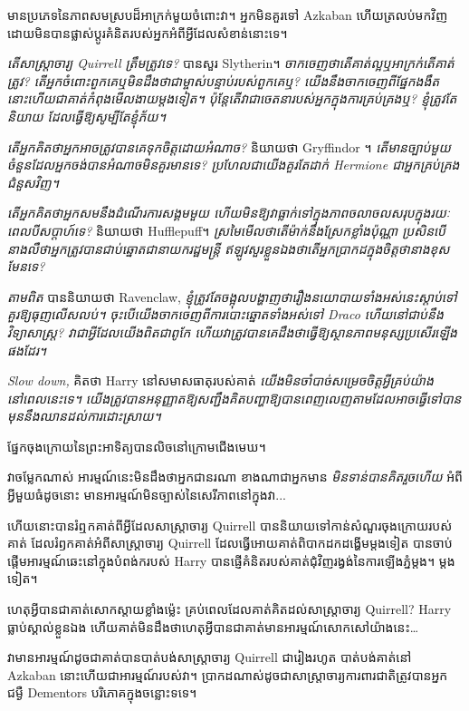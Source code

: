 {{{{{{{មានប្រភេទនៃភាពសមស្របដ៏អាក្រក់មួយចំពោះវា។ អ្នកមិនគួរទៅ Azkaban ហើយត្រលប់មកវិញដោយមិនបានផ្លាស់ប្តូរគំនិតរបស់អ្នកអំពីអ្វីដែលសំខាន់នោះទេ។

\emph{តើសាស្រ្តាចារ្យ Quirrell ត្រឹមត្រូវទេ?} បានសួរ Slytherin។ \emph{ចាកចេញថាតើគាត់ល្អឬអាក្រក់តើគាត់\emph{ត្រូវ}? តើ​អ្នក​ចំពោះ​ពួកគេ​ឬ​មិន​ដឹង​ថា​ជា​ម្ចាស់​បន្ទាប់​របស់​ពួកគេ​ឬ? យើងនឹងចាកចេញពីផ្នែកងងឹត នោះហើយជាគាត់កំពុងមើលងាយម្តងទៀត។ ប៉ុន្តែ​តើ​វា​ជា​ចេតនា​របស់​អ្នក​ក្នុង​ការ​គ្រប់​គ្រង​ឬ? ខ្ញុំត្រូវតែនិយាយ ដែលធ្វើឱ្យសូម្បីតែ\emph{ខ្ញុំ}ភ័យ។}

\emph{តើ​អ្នក​គិត​ថា​អ្នក​អាច​ត្រូវ​បាន​គេ​ទុក​ចិត្ត​ដោយ​អំណាច?} និយាយ​ថា Gryffindor ។ \emph{តើ​មាន​ច្បាប់​មួយ​ចំនួន​ដែល​អ្នក​ចង់​បាន​អំណាច​មិន​គួរ​មាន​ទេ? ប្រហែលជាយើងគួរតែដាក់ Hermione ជាអ្នកគ្រប់គ្រងជំនួសវិញ។}

\emph{តើ​អ្នក​គិត​ថា​អ្នក​សម​នឹង​ដំណើរការ​សង្គម​មួយ ហើយ​មិន​ឱ្យ​វា​ធ្លាក់​ទៅ​ក្នុង​ភាព​ចលាចល​សរុប​ក្នុង​រយៈ​ពេល​បី​សប្តាហ៍​ទេ?} និយាយ​ថា Hufflepuff។ \emph{ស្រមៃមើលថាតើម៉ាក់នឹងស្រែកខ្លាំងប៉ុណ្ណា ប្រសិនបើនាងលឺថាអ្នកត្រូវបានជាប់ឆ្នោតជានាយករដ្ឋមន្ត្រី ឥឡូវសួរខ្លួនឯងថាតើអ្នកប្រាកដក្នុងចិត្តថានាងខុសមែនទេ?}

\emph{តាមពិត} បាននិយាយថា Ravenclaw, \emph{ខ្ញុំត្រូវតែចង្អុលបង្ហាញថារឿងនយោបាយទាំងអស់នេះស្តាប់ទៅគួរឱ្យធុញលើសលប់។ ចុះបើយើងចាកចេញពីការបោះឆ្នោតទាំងអស់ទៅ Draco ហើយនៅជាប់នឹងវិទ្យាសាស្ត្រ? វា​ជា​អ្វី​ដែល​យើង​ពិត​ជា​ពូកែ ហើយ​វា​ត្រូវ​បាន​គេ​ដឹង​ថា​ធ្វើ​ឱ្យ​ស្ថានភាព​មនុស្ស​ប្រសើរ​ឡើង​ផង​ដែរ។}

\emph{Slow down,} គិតថា Harry នៅសមាសធាតុរបស់គាត់ \emph{យើងមិនចាំបាច់សម្រេចចិត្តអ្វីគ្រប់យ៉ាងនៅពេលនេះទេ។ យើង​ត្រូវ​បាន​អនុញ្ញាត​ឱ្យ​សញ្ជឹង​គិត​បញ្ហា​ឱ្យ​បាន​ពេញលេញ​តាម​ដែល​អាច​ធ្វើ​ទៅ​បាន​មុន​នឹង​ឈាន​ដល់​ការ​ដោះស្រាយ។}

ផ្នែកចុងក្រោយនៃព្រះអាទិត្យបានលិចនៅក្រោមជើងមេឃ។

វាចម្លែកណាស់ អារម្មណ៍នេះមិនដឹងថាអ្នកជានរណា ខាងណាជាអ្នកមាន \emph{មិនទាន់បានគិតរួចហើយ} អំពីអ្វីមួយធំដូចនោះ មានអារម្មណ៍មិនច្បាស់នៃសេរីភាពនៅក្នុងវា...

ហើយនោះបានរំឮកគាត់ពីអ្វីដែលសាស្រ្តាចារ្យ Quirrell បាននិយាយទៅកាន់សំណួរចុងក្រោយរបស់គាត់ ដែលរំឭកគាត់អំពីសាស្រ្តាចារ្យ Quirrell ដែលធ្វើអោយគាត់ពិបាកដកដង្ហើមម្តងទៀត បានចាប់ផ្តើមអារម្មណ៍ឆេះនៅក្នុងបំពង់ករបស់ Harry បានផ្ញើគំនិតរបស់គាត់ជុំវិញរង្វង់នៃការឡើងភ្នំម្តង។ ម្តងទៀត។

ហេតុ​អ្វី​បាន​ជា​គាត់​សោក​ស្តាយ​ខ្លាំង​ម្ល៉េះ គ្រប់​ពេល​ដែល​គាត់​គិត​ដល់​សាស្ត្រាចារ្យ Quirrell? Harry ធ្លាប់​ស្គាល់​ខ្លួន​ឯង ហើយ​គាត់​មិន​ដឹង​ថា​ហេតុអ្វី​បាន​ជា​គាត់​មាន​អារម្មណ៍​សោកសៅ​យ៉ាង​នេះ…

វាមានអារម្មណ៍ដូចជាគាត់បានបាត់បង់សាស្រ្តាចារ្យ Quirrell ជារៀងរហូត បាត់បង់គាត់នៅ Azkaban នោះហើយជាអារម្មណ៍របស់វា។ ប្រាកដណាស់ដូចជាសាស្រ្តាចារ្យការពារជាតិត្រូវបានអ្នកជម្ងឺ Dementors បរិភោគក្នុងចន្លោះទទេ។

}}}}}}}
